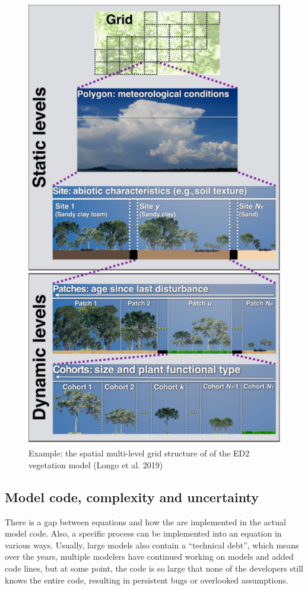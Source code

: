 \documentclass[12pt,oneside]{book}
\begin{document}
\begin{figure}

{\centering \includegraphics[width=0.7\linewidth]{figures/chap1/grid_ED2} 

}

\caption{Example: the spatial multi-level grid structure of of the ED2 vegetation model (Longo et al. 2019)}\label{fig:f11}
\end{figure}

\subsection{Model code, complexity and
uncertainty}\label{model-code-complexity-and-uncertainty}

There is a gap between equations and how the are implemented in the
actual model code. Also, a specific process can be implemented into an
equation in various ways. Usually, large models also contain a
``technical debt'', which means over the years, multiple modelers have
continued working on models and added code lines, but at some point, the
code is so large that none of the developers still knows the entire
code, resulting in persistent bugs or overlooked assumptions.
\end{document}
